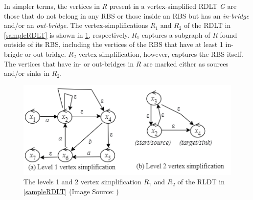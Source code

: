  In simpler terms, the vertices in \emph{R} present in a vertex-simplified RDLT \emph{G} are those that do not belong in any RBS or those inside an RBS but has an \emph{in-bridge} and/or an \emph{out-bridge}.
 The vertex-simplifications $R_1$ and $R_2$ of the RDLT in \ref{sampleRDLT} is shown in \ref{vertexSimplification}, respectively. $R_1$ captures a subgraph of $R$ found outside of its RBS, including the vertices of the RBS that have at least 1 in-brigde or out-bridge. $R_2$ vertex-simplification, however, captures the RBS itself. The vertices that have in- or out-bridges in $R$ are marked either as sources and/or sinks in $R_2$.
 \begin{figure}[H]
    \centering
    \includegraphics[]{../figures/vertexSimplification.png}
    \caption{The levels 1 and 2 vertex simplification $R_1$ and $R_2$ of the RLDT in \ref{sampleRDLT} (Image Source: \cite{MalinaoWCTP2023})}
    \label{vertexSimplification}
\end{figure}

